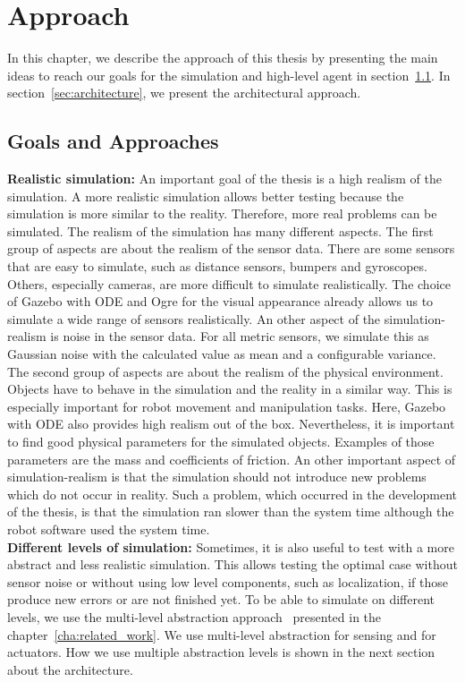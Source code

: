 \chapter{Approach}
\label{cha:approach}
In this chapter, we describe the approach of this thesis by presenting the main ideas to reach our goals for the simulation and high-level agent in section~\ref{sec:goals_and_approaches}. In section~\ref{sec:architecture}, we present the architectural approach.

\section{Goals and Approaches}
\label{sec:goals_and_approaches}
\textbf{Realistic simulation:} An important goal of the thesis is a high realism of the simulation. A more realistic simulation allows better testing because the simulation is more similar to the reality. Therefore, more real problems can be simulated. The realism of the simulation has many different aspects. The first group of aspects are about the realism of the sensor data. There are some sensors that are easy to simulate, such as distance sensors, bumpers and gyroscopes. Others, especially cameras, are more difficult to simulate realistically. The choice of Gazebo with ODE and Ogre for the visual appearance already allows us to simulate a wide range of sensors realistically. An other aspect of the simulation-realism is noise in the sensor data. For all metric sensors, we simulate this as Gaussian noise with the calculated value as mean and a configurable variance. The second group of aspects are about the realism of the physical environment. Objects have to behave in the simulation and the reality in a similar way. This is especially important for robot movement and manipulation tasks. Here, Gazebo with ODE also provides high realism out of the box. Nevertheless, it is important to find good physical parameters for the simulated objects. Examples of those parameters are the mass and coefficients of friction. An other important aspect of simulation-realism is that the simulation should not introduce new problems which do not occur in reality. Such a problem, which occurred in the development of the thesis, is that the simulation ran slower than the system time although the robot software used the system time.\\
\textbf{Different levels of simulation:} Sometimes, it is also useful to test with a more abstract and less realistic simulation. This allows testing the optimal case without sensor noise or without using low level components, such as localization, if those produce new errors or are not finished yet. To be able to simulate on different levels, we use the multi-level abstraction approach~\cite{MultiLevelAbstraction} presented in the chapter~\ref{cha:related_work}. We use multi-level abstraction for sensing and for actuators. How we use multiple abstraction levels is shown in the next section about the architecture.\\
